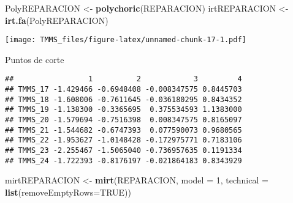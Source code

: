 \documentclass[
  10pt,
  spanish,
]{article}
\newenvironment{Shaded}{\begin{snugshade}}{\end{snugshade}}
\newcommand{\DataTypeTok}[1]{\textcolor[rgb]{0.13,0.29,0.53}{#1}}
\newcommand{\DecValTok}[1]{\textcolor[rgb]{0.00,0.00,0.81}{#1}}
\newcommand{\KeywordTok}[1]{\textcolor[rgb]{0.13,0.29,0.53}{\textbf{#1}}}
\newcommand{\NormalTok}[1]{#1}
\newcommand{\OperatorTok}[1]{\textcolor[rgb]{0.81,0.36,0.00}{\textbf{#1}}}
\newcommand{\OtherTok}[1]{\textcolor[rgb]{0.56,0.35,0.01}{#1}}
\newcommand{\StringTok}[1]{\textcolor[rgb]{0.31,0.60,0.02}{#1}}
\begin{document}
\begin{Shaded}
\begin{Highlighting}[]
\NormalTok{PolyREPARACION <-}\StringTok{ }\KeywordTok{polychoric}\NormalTok{(REPARACION)}
\NormalTok{irtREPARACION <-}\StringTok{ }\KeywordTok{irt.fa}\NormalTok{(PolyREPARACION)}
\end{Highlighting}
\end{Shaded}

\texttt{[image: TMMS\_files/figure-latex/unnamed-chunk-17-1.pdf]}

Puntos de corte

\begin{Shaded}
\end{Shaded}

\begin{verbatim}
##                 1          2            3         4
## TMMS_17 -1.429466 -0.6948408 -0.008347575 0.8445703
## TMMS_18 -1.608006 -0.7611645 -0.036180295 0.8434352
## TMMS_19 -1.138300 -0.3365695  0.375534593 1.1383000
## TMMS_20 -1.579694 -0.7516398  0.008347575 0.8165097
## TMMS_21 -1.544682 -0.6747393  0.077590073 0.9680565
## TMMS_22 -1.953627 -1.0148428 -0.172975771 0.7183106
## TMMS_23 -2.255467 -1.5065040 -0.736957635 0.1191334
## TMMS_24 -1.722393 -0.8176197 -0.021864183 0.8343929
\end{verbatim}

\begin{Shaded}
\begin{Highlighting}[]
\NormalTok{mirtREPARACION <-}\StringTok{ }\KeywordTok{mirt}\NormalTok{(REPARACION, }\DataTypeTok{model =} \DecValTok{1}\NormalTok{, }\DataTypeTok{technical =} \KeywordTok{list}\NormalTok{(}\DataTypeTok{removeEmptyRows=}\OtherTok{TRUE}\NormalTok{)) }
\end{Highlighting}
\end{Shaded}
\end{document}
